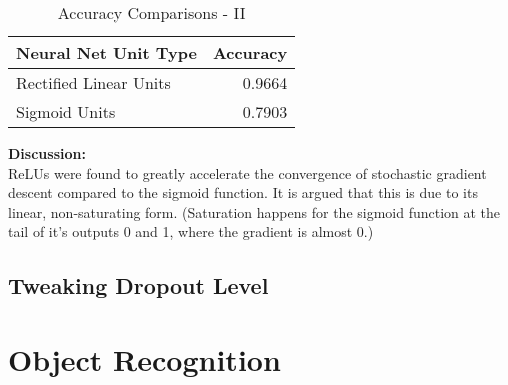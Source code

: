 \documentclass[parskip=half]{scrartcl}
\begin{document}
        \begin{table}[th]
            \centering
            \begin{tabular}{| l | r |}
            \hline
            \textbf{Neural Net Unit Type} & \textbf{Accuracy} \\
            \hline
                \hline
                Rectified Linear Units & 0.9664 \\
                \hline
                Sigmoid Units & 0.7903 \\
            \hline
            \end{tabular}
            \caption{Accuracy Comparisons - II}
            \label{tab:accuracy_comparisons_ii}
        \end{table}

        \textbf{Discussion:}\\
        ReLUs were found to greatly accelerate the convergence of stochastic gradient descent compared to the sigmoid function. It is argued that this is due to its linear, non-saturating form. (Saturation happens for the sigmoid function at the tail of it's outputs 0 and 1, where the gradient is almost 0.)
    

    \subsection{Tweaking Dropout Level} %
    \label{sub:tweaking_dropout_level}

        
    



\section{Object Recognition} %
\label{sec:object_recognition}

\end{document}
